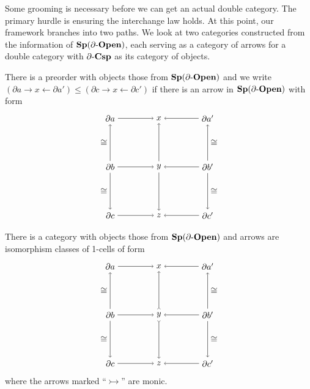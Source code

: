 \documentclass{amsart}
\begin{document}
Some grooming is necessary before we can get an actual double category.  The primary hurdle is ensuring the interchange law holds.  At this point, our framework branches into two paths.  We look at two categories constructed from the information of $ \mathbf{Sp}(\partial \text{-} \mathbf{Open}) $, each serving as a category of arrows for a double category with $ \partial \text{-} \mathbf{Csp} $ as its category of objects.

\begin{df} \label{df:ArrCatMonRwrt}
	There is a preorder with objects those from $ \mathbf{Sp}(\partial \text{-} \mathbf{Open}) $ and we write $ (\partial a \to x \gets \partial a') \leq (\partial c \to x \gets \partial c') $ if there is an arrow in $ \mathbf{Sp}(\partial \text{-} \mathbf{Open}) $ with form
	\[
	\begin{tikzpicture}
		\node (a) at (-1,1) {$ \partial a $};
		\node (x) at (1,1) {$ x $};
		\node (a') at (3,1) {$ \partial a' $};
		\node (b) at (-1,-1) {$ \partial b $};
		\node (y) at (1,-1) {$ y $};
		\node (b') at (3,-1) {$ \partial b' $};
		\node (c) at (-1,-3) {$ \partial c $};
		\node (z) at (1,-3) {$ z $};
		\node (c') at (3,-3) {$ \partial c' $};
		\draw [->] (a) to (x);
		\draw [->] (a') to (x);
		\draw [->] (b) to (y);
		\draw [->] (b') to (y);
		\draw [->] (c) to (z);
		\draw [->] (c') to (z);
		\draw [->] (b) to node [left] {$ \cong $} (a);
		\draw [->] (b) to node [left] {$ \cong $} (c);
		\draw [->] (y) to (x);
		\draw [->] (y) to (z);
		\draw [->] (b') to node [right] {$ \cong $} (a');
		\draw [->] (b') to node [right] {$ \cong $} (c');
	\end{tikzpicture}
	\]
\end{df}

\begin{df} \label{df:ArrCatRwrt}
	There is a category with objects those from $ \mathbf{Sp}(\partial \text{-} \mathbf{Open}) $ and arrows are isomorphism classes of 1-cells of form
\[
\begin{tikzpicture}
	\node (a) at (-1,1) {$ \partial a $};
	\node (x) at (1,1) {$ x $};
	\node (a') at (3,1) {$ \partial a' $};
	\node (b) at (-1,-1) {$ \partial b $};
	\node (y) at (1,-1) {$ y $};
	\node (b') at (3,-1) {$ \partial b' $};
	\node (c) at (-1,-3) {$ \partial c $};
	\node (z) at (1,-3) {$ z $};
	\node (c') at (3,-3) {$ \partial c' $};
	\draw [->] (a) to (x);
	\draw [->] (a') to (x);
	\draw [->] (b) to (y);
	\draw [->] (b') to (y);
	\draw [->] (c) to (z);
	\draw [->] (c') to (z);
	\draw [->] (b) to node [left] {$ \cong $} (a);
	\draw [->] (b) to node [left] {$ \cong $} (c);
	\draw [>->] (y) to (x);
	\draw [>->] (y) to (z);
	\draw [->] (b') to node [right] {$ \cong $} (a');
	\draw [->] (b') to node [right] {$ \cong $} (c');
\end{tikzpicture}
\]
where the arrows marked ``$ \rightarrowtail $'' are monic. 
\end{df}
\end{document}
